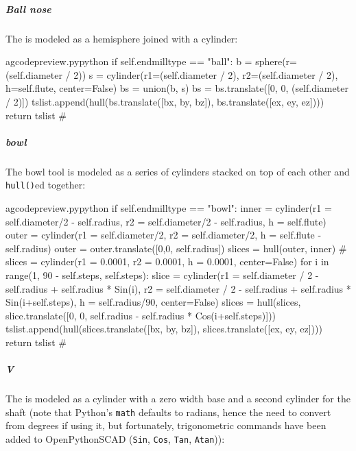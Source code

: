 \documentclass{ltxdoc}
\begin{document}
\subparagraph{Ball nose}

The  is modeled as a hemisphere joined with a cylinder:

\lstset{firstnumber=\thegcpy}
\begin{writecode}{a}{gcodepreview.py}{python}
        if self.endmilltype == "ball":
            b = sphere(r=(self.diameter / 2))
            s = cylinder(r1=(self.diameter / 2), r2=(self.diameter / 2), h=self.flute, center=False)
            bs = union(b, s)
            bs = bs.translate([0, 0, (self.diameter / 2)])
            tslist.append(hull(bs.translate([bx, by, bz]), bs.translate([ex, ey, ez])))
            return tslist
#
\end{writecode}
\addtocounter{gcpy}{8}

\subparagraph{bowl} 

The bowl tool is modeled as a series of cylinders stacked on top of each other and \verb|hull()|ed together:

\lstset{firstnumber=\thegcpy}
\begin{writecode}{a}{gcodepreview.py}{python}
        if self.endmilltype == "bowl":
            inner = cylinder(r1 = self.diameter/2 - self.radius, r2 = self.diameter/2 - self.radius, h = self.flute)
            outer = cylinder(r1 = self.diameter/2, r2 = self.diameter/2, h = self.flute - self.radius)
            outer = outer.translate([0,0, self.radius])
            slices = hull(outer, inner)
#    slices = cylinder(r1 = 0.0001, r2 = 0.0001, h = 0.0001, center=False)
            for i in range(1, 90 - self.steps, self.steps):
                slice = cylinder(r1 = self.diameter / 2 - self.radius + self.radius * Sin(i), r2 = self.diameter / 2 - self.radius + self.radius * Sin(i+self.steps), h = self.radius/90, center=False)
                slices = hull(slices, slice.translate([0, 0, self.radius - self.radius * Cos(i+self.steps)]))
            tslist.append(hull(slices.translate([bx, by, bz]), slices.translate([ex, ey, ez])))
            return tslist
#
\end{writecode}
\addtocounter{gcpy}{12}

\subparagraph{V}

The  is modeled as a cylinder with a zero width base and a second cylinder for the shaft (note that Python's \verb|math| defaults to radians, hence the need to convert from degrees if using it, but fortunately, trigonometric commands have been added to OpenPythonSCAD (\verb|Sin|, \verb|Cos|, \verb|Tan|, \verb|Atan|)):
\end{document}
